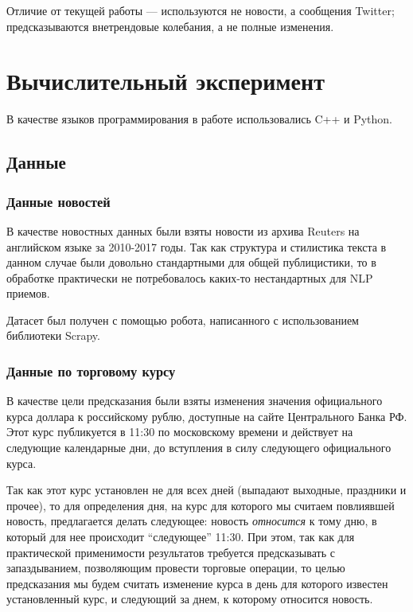 \documentclass[pdftex,ptm,14pt,a4paper]{extreport}
\begin{document}
Отличие от текущей работы --- используются не новости, а сообщения Twitter; предсказываются внетрендовые колебания,
а не полные изменения.

\fi

\chapter{Вычислительный эксперимент}

В качестве языков программирования в работе использовались C++ и Python\cite{python}.

\section{Данные}

\subsection{Данные новостей}

В качестве новостных данных были взяты новости из архива Reuters на английском языке за 2010-2017 годы\cite{reuters}.
Так как структура и стилистика текста в данном случае были довольно стандартными для общей публицистики,
то в обработке практически не потребовалось каких-то нестандартных для NLP приемов.

Датасет был получен с помощью робота, написанного с использованием библиотеки Scrapy\cite{scrapy}.

\subsection{Данные по торговому курсу}

В качестве цели предсказания были взяты изменения значения официального курса доллара к российскому рублю, доступные
на сайте Центрального Банка РФ\cite{courses}.
Этот курс публикуется в 11:30 по московскому времени и действует на следующие календарные дни, до вступления в силу следующего
официального курса.

Так как этот курс установлен не для всех дней (выпадают выходные, праздники и прочее),
то для определения дня, на курс для которого мы считаем повлиявшей новость, предлагается делать следующее:
новость \textit{относится} к тому дню, в который для нее происходит ``следующее'' 11:30. При этом, так как для практической
применимости результатов требуется предсказывать с запаздыванием, позволяющим провести торговые операции,
то целью предсказания мы будем считать изменение курса в день для которого известен установленный курс, и
следующий за днем, к которому относится новость.
\end{document}
